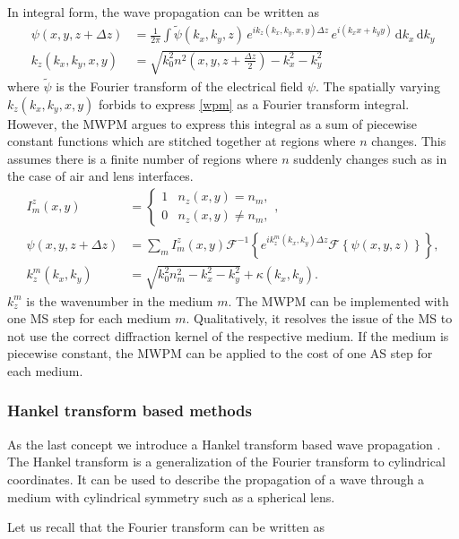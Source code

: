 \documentclass[a4paper,12pt]{article}
\begin{document}
In integral form, the wave propagation can be written as
\begin{align}
\label{wpm}
    \psi(x,y,z+\Delta z) &= \frac{1}{2\pi} \int \widetilde{\psi}(k_x, k_y, z) \, e^{ik_z(k_x, k_y, x, y) \Delta z} \, e^{i (k_x x + k_y y)} \, \mathrm{d}k_x \, \mathrm{d}k_y\\
    k_z(k_x, k_y, x, y) &= \sqrt{k_0^2 n^2 \left( x,y,z + \frac{\Delta z}{2} \right) - k_x^2 - k_y^2}
\end{align}
where $\widetilde{\psi}$ is the Fourier transform of the electrical field $\psi$.
The spatially varying $k_z(k_x, k_y, x, y)$ forbids to express \autoref{wpm} as a Fourier transform integral.
However, the MWPM argues to express this integral as a sum of piecewise constant functions which are stitched together at regions where $n$ changes.
This assumes there is a finite number of regions where $n$ suddenly changes such as in the case of air and lens interfaces.
\begin{align}
    I_m^z(x,y) &=
    \begin{cases}
    1 & n_z(x,y) = n_m, \\
    0 & n_z(x,y) \ne n_m,
    \end{cases}, \\
    \psi(x,y,z+\Delta z) &= \sum_m I_m^z(x,y) \mathcal{F}^{-1} \left\{ e^{i k_z^m(k_x,k_y)\Delta z} \mathcal{F} \left\{\psi(x,y,z) \right\} \right\},\\
    k_z^m(k_x, k_y) &= \sqrt{k_0^2 n_m^2 - k_x^2 - k_y^2} + \kappa(k_x, k_y).
\end{align}
$k_z^m$ is the wavenumber in the medium $m$.
The MWPM can be implemented with one MS step for each medium $m$.
Qualitatively, it resolves the issue of the MS to not use the correct diffraction kernel of the respective medium. If the medium is piecewise constant, the MWPM can be applied to the cost of one AS step for each medium.

\subsubsection{Hankel transform based methods}
As the last concept we introduce a Hankel transform based wave propagation \cite{Guizar-Sicairos_Gutiérrez-Vega_2004}.
The Hankel transform is a generalization of the Fourier transform to cylindrical coordinates. It can be used to describe the propagation of a wave through a medium with cylindrical symmetry such as a spherical lens.

Let us recall that the Fourier transform can be written as
\end{document}
